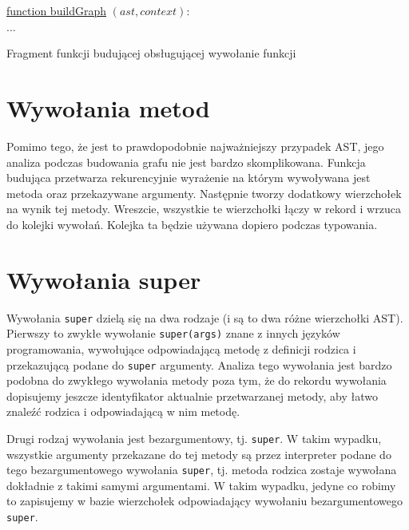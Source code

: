 \documentclass[shortabstract,mgr]{iithesis}
\newcommand{\algsize}{\small}
\begin{document}
\begin{algorithm}
    \algsize
    \underline{function buildGraph} $(ast, context)$:\\
    ...\\
    \caption{Fragment funkcji budującej obsługującej wywołanie funkcji}
    \label{alg:buildGraph-handleSend}
\end{algorithm}


\section{Wywołania metod}

Pomimo tego, że jest to prawdopodobnie najważniejszy przypadek AST, jego analiza podczas budowania grafu nie jest bardzo skomplikowana. Funkcja budująca przetwarza rekurencyjnie wyrażenie na którym wywoływana jest metoda oraz przekazywane argumenty. Następnie tworzy dodatkowy wierzchołek na wynik tej metody. Wreszcie, wszystkie te wierzchołki łączy w rekord i wrzuca do kolejki wywołań. Kolejka ta będzie używana dopiero podczas typowania.

\section{Wywołania super}

Wywołania \texttt{super} dzielą się na dwa rodzaje (i są to dwa różne wierzchołki AST). Pierwszy to zwykłe wywołanie \texttt{super(args)} znane z innych języków programowania, wywołujące odpowiadającą metodę z definicji rodzica i przekazującą podane do \texttt{super} argumenty. Analiza tego wywołania jest bardzo podobna do zwykłego wywołania metody poza tym, że do rekordu wywołania dopisujemy jeszcze identyfikator aktualnie przetwarzanej metody, aby łatwo znaleźć rodzica i odpowiadającą w nim metodę.

Drugi rodzaj wywołania jest bezargumentowy, tj. \texttt{super}. W takim wypadku, wszystkie argumenty przekazane do tej metody są przez interpreter podane do tego bezargumentowego wywołania \texttt{super}, tj. metoda rodzica zostaje wywołana dokładnie z takimi samymi argumentami. W takim wypadku, jedyne co robimy to zapisujemy w bazie wierzchołek odpowiadający wywołaniu bezargumentowego \texttt{super}.
\end{document}
